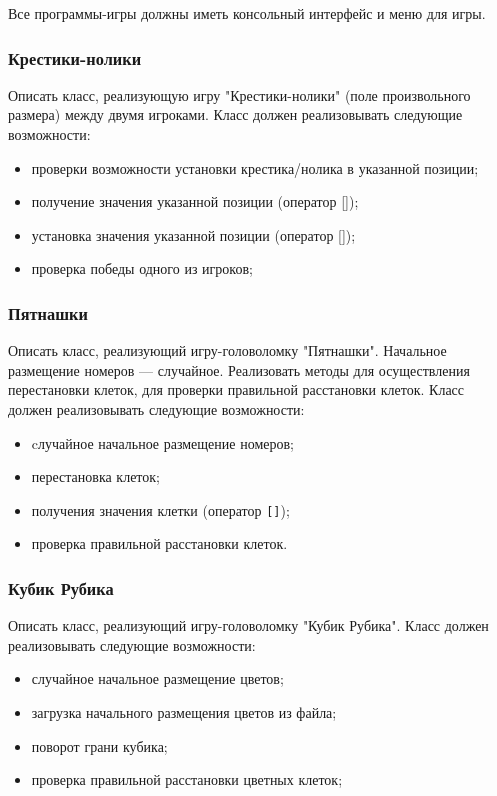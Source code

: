 \documentclass[a4paper,12pt]{article}
\begin{document}
Все программы-игры должны иметь консольный интерфейс и меню для игры.

\subsubsection{Крестики-нолики}

Описать класс, реализующую игру "Крестики-нолики" (поле произвольного размера) между двумя игроками.
Класс должен реализовывать следующие возможности:

\begin{itemize}
\item проверки возможности установки крестика/нолика в указанной
  позиции;
\item получение значения указанной позиции (оператор []);
\item установка значения указанной позиции (оператор []);
\item проверка победы одного из игроков;
\end{itemize}

\subsubsection{Пятнашки}

Описать класс, реализующий игру-головоломку "Пятнашки". Начальное
размещение номеров — случайное. Реализовать методы для осуществления
перестановки клеток, для проверки правильной расстановки клеток.
Класс должен реализовывать следующие возможности:

\begin{itemize}
\item cлучайное начальное размещение номеров;
\item перестановка клеток;
\item получения значения клетки (оператор \lstinline|[]|);
\item проверка правильной расстановки клеток.
\end{itemize}

\subsubsection{Кубик Рубика}

Описать класс, реализующий игру-головоломку "Кубик Рубика".  Класс
должен реализовывать следующие возможности:

\begin{itemize}
\item случайное начальное размещение цветов;
\item загрузка начального размещения цветов из файла;
\item поворот грани кубика;
\item проверка правильной расстановки цветных клеток;
\end{itemize}
\end{document}
